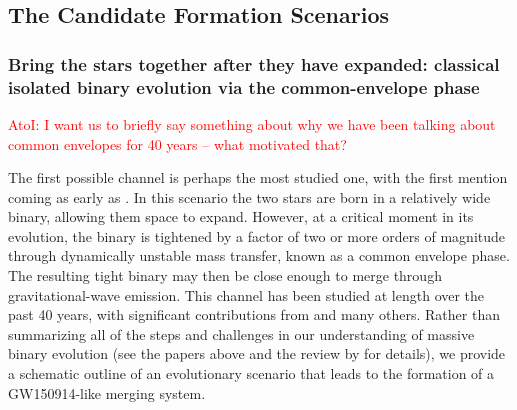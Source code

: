 \documentclass[iop,onecolumn]{revtex4}
\newcommand{\ajf}[1]{\textcolor{red}{AtoI: #1}}
\begin{document}
\subsection{The Candidate Formation Scenarios}
\subsubsection{Bring the stars together after they have expanded: classical isolated binary evolution via the common-envelope phase}

\ajf{I want us to briefly say something about why we have been talking about common envelopes for 40 years -- what motivated that?}

The first possible channel is perhaps the most studied one, with the first mention coming as early as \citet{Tutukov:1973}.  In this scenario the two stars are born in a relatively wide binary, allowing them space to expand.  However, at a critical moment in its evolution, the binary is tightened by a factor of two or more orders of magnitude through dynamically unstable mass transfer, known as a common envelope phase. The resulting tight binary may then be close enough to merge through gravitational-wave emission. This channel has been studied at length over the past 40 years, with significant contributions from \citet{TutukovYungelson:1993,Lipunov:1997,BetheBrown:1998,Nelemans:2003,VossTauris:2003,Pfahl:2005,Dewi:2006,Kalogera:2007,OShaughnessy:2008,Dominik:2012,Dominik:2014, Belczynski:2016,EldridgeStanway:2016} and many others. Rather than summarizing all of the steps and challenges in our understanding of massive binary evolution (see the papers above and the review by \citet{PostnovYungelson:2014} for details), we provide a schematic outline of an evolutionary scenario that leads to the formation of a GW150914-like merging system.
\end{document}
